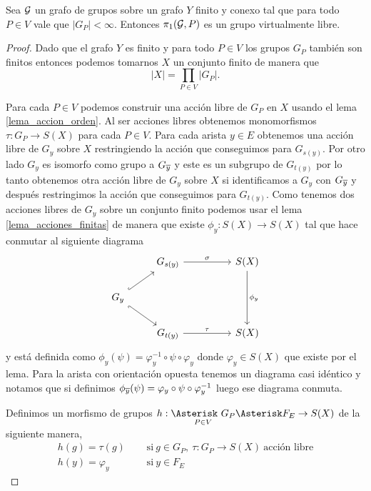 \documentclass[tesis.tex]{subfiles}
\begin{document}
\begin{teo}\cite{karrass1973finite}
	Sea $\cal G$ un grafo de grupos sobre un grafo $Y$ finito y conexo tal que para todo $P \in V$ vale que $|G_{P}| < \infty$.
	Entonces $\pi_1({\cal G}, P)$ es un grupo virtualmente libre.
\end{teo}
\begin{proof}
	Dado que el grafo $Y$ es finito y para todo $P \in V$ los grupos $G_P$ también son finitos entonces podemos tomarnos $X$ un conjunto finito de manera que
	\[
		|X| = \prod_{P \in V} |G_P|.
	\] 
	
	Para cada $P \in V$ podemos construir una acción libre de $G_P$ en $X$ usando el lema \ref{lema_accion_orden}.
	Al ser acciones libres obtenemos monomorfismos $\tau: G_P \to S(X)$ para cada $P \in V$.
	Para cada arista $y \in E$ obtenemos una acción libre de $G_{y}$ sobre $X$ restringiendo la acción que conseguimos para $G_{s(y)}$.
	Por otro lado $G_{y}$ es isomorfo como grupo a $G_{\overline y}$ y este es un subgrupo de $G_{t(y)}$ por lo tanto obtenemos otra acción libre de $G_{y}$ sobre $X$ si identificamos a $G_{y}$ con $G_{\overline y}$ y después restringimos la acción que conseguimos para $G_{t(y)}$.
	Como tenemos dos acciones libres de $G_{y}$ sobre un conjunto finito podemos usar el lema \ref{lema_acciones_finitas} de manera que existe $\phi_y: S(X) \to S(X)$ tal que hace conmutar al siguiente diagrama
	\[\begin{tikzcd}
		& {G_{s(y)}} && {S(X)} \\
		{G_y} \\
		& {G_{t(y)}} && {S(X)}
		\arrow["\sigma", from=1-2, to=1-4]
		\arrow["\tau", from=3-2, to=3-4]
		\arrow[hook, from=2-1, to=1-2]
		\arrow[hook', from=2-1, to=3-2]
		\arrow["\phi_y", from=1-4, to=3-4]
	\end{tikzcd}\]
	y está definida como $\phi_{y}(\psi) = \varphi_{y}^{-1} \circ \psi \circ \varphi_{y}$ donde $\varphi_{y} \in S(X)$ que existe por el lema.
	Para la arista con orientación opuesta tenemos un diagrama casi idéntico y notamos que si definimos $\phi_{\overline y}(\psi) = \varphi_{y} \circ \psi \circ \varphi_{y}^{-1}$ luego ese diagrama conmuta.
	
	Definimos un morfismo de grupos $h: \underset{P \in V}{\Asterisk \ G_{P}} \Asterisk F_{E} \to S(X)$ de la siguiente manera,
	\begin{align*}
		 h(g) = \tau(g) & \ \ \  \ \ \  \text{si} \ g \in G_{P}, \ \tau:G_{P} \to S(X) \ \text{acción libre} \\
		h(y) = \varphi_{y} & \ \ \ \ \ \ \text{si} \ y \in F_{E}
	\end{align*}
	

\end{proof}
\end{document}
